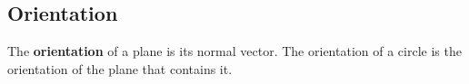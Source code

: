 


\subsection{Orientation}

\begin{defn2}
The {\bf orientation} of a plane is its normal vector.
The orientation of a circle is the orientation of the plane that contains it.
\end{defn2}

